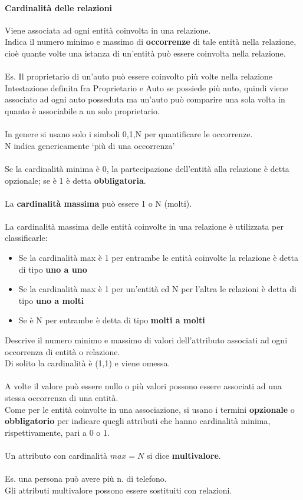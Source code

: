 \documentclass[../main.tex]{subfiles}
\begin{document}
	\paragraph{Cardinalità delle relazioni}
	Viene associata ad ogni entità coinvolta in una relazione.\\
	Indica il numero minimo e massimo di \textbf{occorrenze} di tale entità nella relazione, cioè quante volte una istanza di un’entità può essere coinvolta nella relazione.\\\\
	Es. Il proprietario di un’auto può essere coinvolto più volte nella relazione Intestazione definita fra Proprietario e Auto se possiede più auto, quindi viene associato ad ogni auto posseduta ma un’auto può comparire una sola volta in quanto è associabile a un solo proprietario.\\\\
	In genere si usano solo i simboli 0,1,N per quantificare le occorrenze. \\
	N indica genericamente ‘più di una occorrenza’\\\\
	Se la cardinalità minima è 0, la partecipazione dell’entità alla relazione è detta opzionale; se è 1 è detta \textbf{obbligatoria}.\\\\
	La \textbf{cardinalità massima} può essere 1 o N (molti).\\\\
	La cardinalità massima delle entità coinvolte in una relazione è utilizzata per classificarle:
	\begin{itemize}
		\item Se la cardinalità max è 1 per entrambe le entità coinvolte la relazione è detta di tipo \textbf{uno a uno}
		\item Se la cardinalità max è 1 per un’entità ed N per l’altra le relazioni è detta di tipo \textbf{uno a molti}
		\item Se è N per entrambe è detta di tipo \textbf{molti a molti}
	\end{itemize}
	Descrive il numero minimo e massimo di valori dell’attributo associati ad ogni occorrenza di entità o relazione. \\
	Di solito la cardinalità è (1,1) e viene omessa.\\\\
	A volte il valore può essere nullo o più valori possono essere associati ad una stessa occorrenza di una entità.\\
	Come per le entità coinvolte in una associazione, si usano i termini \textbf{opzionale} o \textbf{obbligatorio} per indicare quegli attributi che hanno cardinalità minima, rispettivamente, pari a 0 o 1.\\\\
	Un attributo con cardinalità $max = N$ si dice \textbf{multivalore}.\\\\
	Es. una persona può avere più n. di telefono. \\
	Gli attributi multivalore possono essere sostituiti con relazioni.
\end{document}
